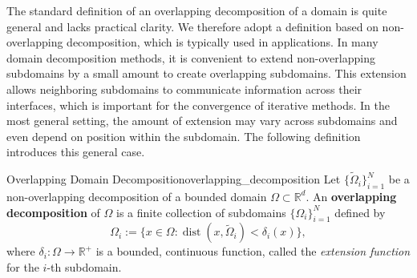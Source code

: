 \documentclass[a4paper, 11pt]{article}
\theoremstyle{remark}
\begin{document}
\vspace{8pt}
\noindent The standard definition of an overlapping decomposition of a domain is quite general and lacks practical clarity. We therefore adopt a definition based on non-overlapping decomposition, which is typically used in applications. In many domain decomposition methods, it is convenient to extend non-overlapping subdomains by a small amount to create overlapping subdomains.  
This extension allows neighboring subdomains to communicate information across their interfaces, which is important for the convergence of iterative methods.  
In the most general setting, the amount of extension may vary across subdomains and even depend on position within the subdomain. The following definition introduces this general case.

\begin{definition}{Overlapping Domain Decomposition}{overlapping_decomposition}
Let $\{\widetilde{\Omega}_i\}_{i=1}^N$ be a non-overlapping decomposition of a bounded domain $\Omega\subset \mathbb{R}^{d}$. An \textbf{overlapping decomposition} of $\Omega$ is a finite collection of subdomains $\{\Omega_i\}_{i=1}^N$ defined by
\begin{equation*}
    \Omega_i := \{ x \in \Omega : \operatorname{dist}(x, \widetilde{\Omega}_i) < \delta_i(x) \},
\end{equation*}
where $\delta_i: \Omega \to \mathbb{R}^{+}$ is a bounded, continuous function, called the \textit{extension function} for the $i$-th subdomain.
\end{definition}
\end{document}
